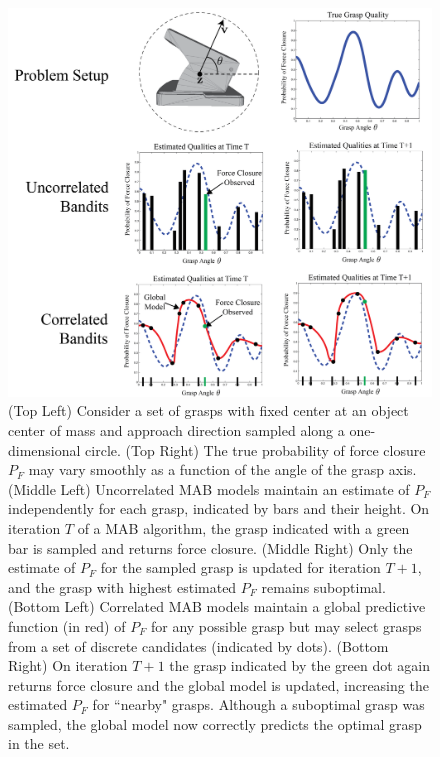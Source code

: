 \begin{figure}[t!]
\centering
\includegraphics[scale=0.22]{figures/illustrations/correlated_bandits.png}
\caption{(Top Left) Consider a set of grasps with fixed center at an object center of mass and approach direction sampled along a one-dimensional circle. (Top Right) The true probability of force closure $P_F$ may vary smoothly as a function of the angle of the grasp axis. (Middle Left) Uncorrelated MAB models maintain an estimate of $P_F$ independently for each grasp, indicated by bars and their height. On iteration $T$ of a MAB algorithm, the grasp indicated with a green bar is sampled and returns force closure. (Middle Right) Only the estimate of $P_F$ for the sampled grasp is updated for iteration $T+1$, and the grasp with highest estimated $P_F$ remains suboptimal. (Bottom Left) Correlated MAB models maintain a global predictive function (in red) of $P_F$ for any possible grasp but may select grasps from a set of discrete candidates (indicated by dots). (Bottom Right) On iteration $T+1$ the grasp indicated by the green dot again returns force closure and the global model is updated, increasing the estimated $P_F$ for ``nearby" grasps. Although a suboptimal grasp was sampled, the global model now correctly predicts the optimal grasp in the set. }
\vspace*{-15pt}
\end{figure}

